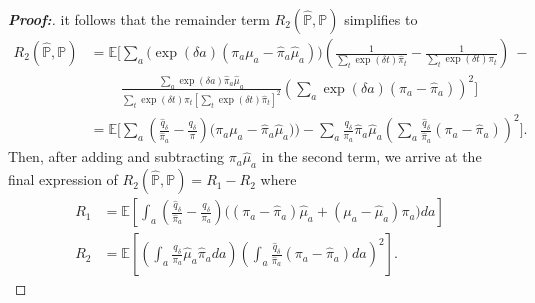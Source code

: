 \documentclass[11pt,twoside]{article}
\theoremstyle{definition}
\theoremstyle{remark}
\begin{document}
\begin{proof}[\textbf{Proof:}]
it follows that the remainder term $R_2(\widehat{\mathbb{P}}, \mathbb{P})$ simplifies to
\begin{align*}
    R_2(\widehat{\mathbb{P}}, \mathbb{P}) &=  \mathbb{E} \Bigg[ \sum_a \Big( \exp(\delta a) (\pi_a \mu_a - \widehat{\pi}_a \widehat{\mu}_a)\Big) \left(\frac{1}{\sum_t \exp(\delta t) \widehat{\pi}_t} - \frac{1}{\sum_t \exp(\delta t) \pi_t}\right) \: - \\
    &\phantom{{}={\mathbb{E} \Bigg[}}  \frac{\sum_a \exp(\delta a) \widehat{\pi}_a \widehat{\mu}_a}{\sum_t \exp(\delta t) \pi_t \left[ \sum_t \exp(\delta t) \widehat{\pi}_t \right]^2}\left(\sum_a \exp(\delta a) (\pi_a - \widehat{\pi}_a) \right)^2 \Bigg] \\
    &= \mathbb{E} \Bigg[\sum_a \left(\frac{\widehat{q}_\delta}{\widehat{\pi}_a} - \frac{q_\delta}{\pi} \right) \big( \pi_a \mu_a - \widehat{\pi}_a \widehat{\mu}_a)\big)  - \sum_a \frac{q_\delta}{\pi_a} \widehat{\pi}_a \widehat{\mu}_a \left(\sum_a \frac{\widehat{q}_\delta}{\widehat{\pi}_a }(\pi_a - \widehat{\pi}_a) \right)^2\Bigg].
\end{align*}
Then, after adding and subtracting $\pi_a \widehat{\mu}_a$ in the second term, we arrive at the final expression of $R_2(\widehat{\mathbb{P}}, \mathbb{P}) = R_1 - R_2$ where
    \begin{align*}
        R_1 &= \mathbb{E} \left[\int_a \left(\frac{\widehat{q}_\delta}{\widehat{\pi}_a} - \frac{q_\delta}{\pi_a} \right)\Big((\pi_a - \widehat{\pi}_a) \widehat{\mu}_a + (\mu_a - \widehat{\mu}_a) \pi_a \Big) da\right]  \\
        R_2 &= \mathbb{E} \left[\left(\int_a \frac{q_\delta}{\pi_a} \widehat{\mu}_a\widehat{\pi}_a da \right)\left(\int_a \frac{\widehat{q}_\delta}{\widehat{\pi}_a} (\pi_a - \widehat{\pi}_a) da \right)^2\right].
    \end{align*}
\end{proof}
\end{document}
